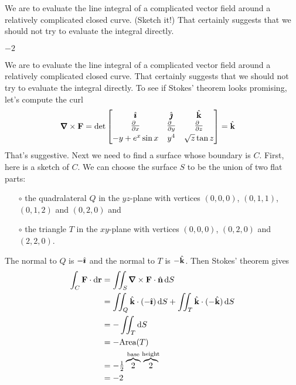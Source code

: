 \begin{hint} 
We are to evaluate the line integral of a complicated vector field
around a relatively complicated closed curve. (Sketch it!)
That certainly suggests that
we should not try to evaluate the integral directly.
\end{hint}

\begin{answer} 
$-2$
\end{answer}


\begin{solution}
We are to evaluate the line integral of a complicated vector field
around a relatively complicated closed curve. 
That certainly suggests that
we should not try to evaluate the integral directly. To see if
Stokes' theorem looks promising, let's compute the curl
\begin{align*}
\vnabla\times\vF
&=\det\left[\begin{matrix}
\hi &\hj &\hk \\
\tfrac{\partial\hfill}{\partial x} & \tfrac{\partial\hfill}{\partial y} & 
                \tfrac{\partial\hfill}{\partial z} \\[0.05in]
-y+e^x\sin x & y^4 & \sqrt{z}\tan z
\end{matrix}
\right]
=\hk
\end{align*}
That's suggestive. Next we need to find a surface whose boundary is $C$.
First, here is a sketch of $C$.
We can choose the surface $S$ to be the union of two flat parts:
\begin{itemize}\itemsep1pt \parskip0pt  %
\item[$\circ$]
the quadralateral $Q$ in the $yz$-plane with vertices $(0,0,0)$,
$(0,1,1)$, $(0,1,2)$ and $(0,2,0)$ and
\item[$\circ$]
the triangle $T$ in the $xy$-plane with vertices $(0,0,0)$,
$(0,2,0)$ and $(2,2,0)$.
\end{itemize} 
The normal to $Q$ is $-\hat{\pmb{\imath}}$ and the normal to $T$ is $-\hat{\mathbf{k}}$. Then Stokes'
theorem gives
\begin{align*}
\int_C\vF\cdot\dee{\vr}
&=\dblInt_S  \vnabla\times\vF\cdot\hn\,\dee{S} \\
&=\dblInt_Q  \hk\cdot(-\hi)\,\dee{S} + \dblInt_T  \hk\cdot(-\hk)\,\dee{S} \\
&= - \dblInt_T \dee{S} \\
&=-\text{Area}(T) \\
&= -\half\overbrace{2}^{\text{base}}\overbrace{2}^{\text{height}} \\
&=-2
\end{align*}
\end{solution}

